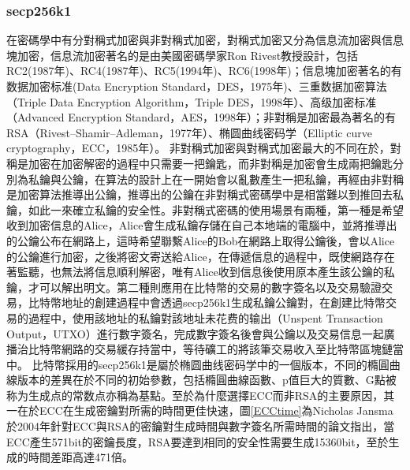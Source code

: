 			\subsubsection{secp256k1}
			在密碼學中有分對稱式加密與非對稱式加密，對稱式加密又分為信息流加密與信息塊加密，信息流加密著名的是由美國密碼學家Ron Rivest教授設計，包括RC2(1987年)\supercite{OnthedesignandsecurityofRC2}、RC4(1987年)\supercite{Rc4}、RC5(1994年)\supercite{TheRC5encryptionalgorithm}、RC6(1998年)\supercite{TheRC6blockcipher.v1.1August201998}；信息塊加密著名的有数据加密标准(Data Encryption Standard，DES，1975年)\supercite{Dataencryptionstandard}、三重数据加密算法（Triple Data Encryption Algorithm，Triple DES，1998年）\supercite{TrippleDataEncryptionAlgorithmModesofOperation}、高级加密标准（Advanced Encryption Standard，AES，1998年）\supercite{ThedesignofRijndael:AES-theadvancedencryptionstandard}；非對稱是加密最為著名的有RSA（Rivest–Shamir–Adleman，1977年）\supercite{Cryptographiccommunicationssystemandmethod}、椭圆曲线密码学（Elliptic curve cryptography，ECC，1985年）\supercite{Ellipticcurvecryptosystems}。
			非對稱式加密與對稱式加密最大的不同在於，對稱是加密在加密解密的過程中只需要一把鑰匙，而非對稱是加密會生成兩把鑰匙分別為私鑰與公鑰，在算法的設計上在一開始會以亂數產生一把私鑰，再經由非對稱是加密算法推導出公鑰，推導出的公鑰在非對稱式密碼學中是相當難以到推回去私鑰，如此一來確立私鑰的安全性。非對稱式密碼的使用場景有兩種，第一種是希望收到加密信息的Alice，Alice會生成私鑰存儲在自己本地端的電腦中，並將推導出的公鑰公布在網路上，這時希望聯繫Alice的Bob在網路上取得公鑰後，會以Alice的公鑰進行加密，之後將密文寄送給Alice，在傳遞信息的過程中，既使網路存在著監聽，也無法將信息順利解密，唯有Alice收到信息後使用原本產生該公鑰的私鑰，才可以解出明文。第二種則應用在比特幣的交易的數字簽名以及交易驗證交易，比特幣地址的創建過程中會透過secp256k1生成私鑰公鑰對，在創建比特幣交易的過程中，使用該地址的私鑰對該地址未花费的输出（Unspent Transaction Output，UTXO）進行數字簽名，完成數字簽名後會與公鑰以及交易信息一起廣播治比特幣網路的交易緩存持當中，等待礦工的將該筆交易收入至比特幣區塊鏈當中。
			比特幣採用的secp256k1是屬於椭圆曲线密码学中的一個版本，不同的橢圓曲線版本的差異在於不同的初始參數，包括橢圓曲線函數、p值巨大的質數、G點被称为⽣成点的常数点亦稱為基點。至於為什麼選擇ECC而非RSA的主要原因，其一在於ECC在生成密鑰對所需的時間更佳快速，圖\ref{ECCtime}為Nicholas Jansma於2004年針對ECC與RSA的密鑰對生成時間與數字簽名所需時間的論文\supercite{Performancecomparisonofellipticcurveandrsadigitalsignatures}指出，當ECC產生571bit的密鑰長度，RSA要達到相同的安全性需要生成15360bit，至於生成的時間差距高達471倍。
			
